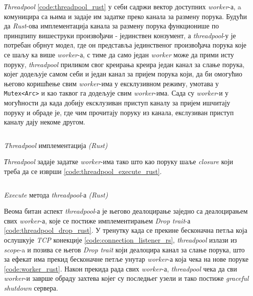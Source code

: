 \textit{Тhreadpool} \ref{code:threadpool_rust} у себи садржи вектор доступних \textit{worker}-а, a комуницира са њима и задаје им задатке  преко канала за размену порука. Будући да \textit{Rust}-ова имплементација канала за размену порука функционише по принцпипу вишеструки произвођачи - јединствен конзумент, а \textit{threadpool}-у је потребан обрнут модел, где он представља јединственог произвођача порука које се шаљу ка више \textit{worker}-а, с тиме да само један \textit{worker} може да прими исту поруку, \textit{threadpool} приликом свог креирања креира  један канал за слање порука, којег додељује самом себи и један канал за пријем порука који, да би омогућио његово коришћење свим \textit{worker}-има у ексклузивном режиму, умотава у \texttt{Мutex<Arc>} и као таквог га додељује свим \textit{worker}-има. Сада су \textit{worker}-и у могућности да када добију ексклузиван приступ каналу за пријем ишчитају поруку и обраде је, где чим прочитају поруку из канала, екслузиван приступ каналу дају некоме другом.\\

\begin{listing}[H]
\inputminted{rust}{kodovi/threadpool.rs}
\caption{\textit{Threadpool} имплементација \textit{(Rust)}}
\label{code:threadpool_rust}
\end{listing}

\textit{Тhreadpool} задаје задатке \textit{worker}-има тако што као поруку шаље \textit{closure} који треба да се изврши \ref{code:threadpool_execute_rust}.\\

\begin{listing}[H]
\inputminted{rust}{kodovi/threadpool_execute.rs}
\caption{\textit{Execute} метода \textit{threadpool}-а \textit{(Rust)}}
\label{code:threadpool_execute_rust}
\end{listing}

Веома битан аспект \textit{threadpool}-а је његово деалоцирање заједно са деалоцирањем свих \textit{worker}-а, које се постиже имплементирањем \textit{Drop trait}-а \ref{code:threadpool_drop_rust}. У тренутку када се прекине бесконачна петља која ослушкује \textit{TCP} конекције \ref{code:connection_listener_rs}, \textit{threadpool} излази из \textit{scope}-a и позива се његов \textit{Drop trait} који деалоцира канал за слање порука, што за ефекат има прекид бесконачне петље унутар \textit{worker}-а која чека на нове поруке \ref{code:worker_rust}. Након прекида рада свих \textit{worker}-а, \textit{threadpool} чека да сви \textit{worker}-и заврше обраду захтева којег су последњег узели и тако постиже \textit{graceful shutdown} сервера.

